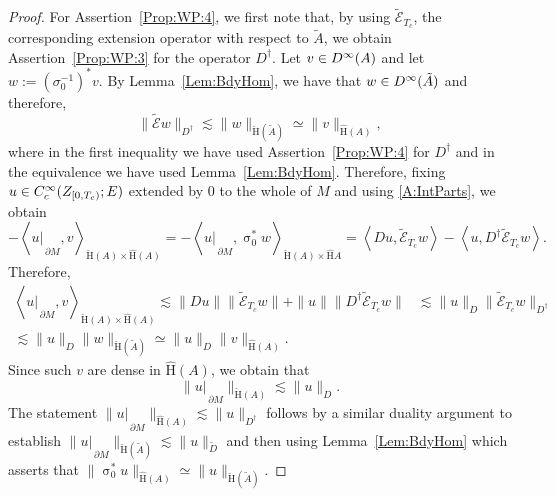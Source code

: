 \documentclass[a4paper,10pt,reqno]{amsart}
\newcommand{\sym}{\upsigma}
\newcommand{\rest}[1]{{{\lvert_{}}_{}}_{#1}}
\newcommand{\norm}[1]{\| #1 \|}%
\newcommand{\Ck}[2][{}]{{\rm C}^{#2}_{\rm #1}}%
\newcommand{\Dk}[2][{}]{{\rm D}^{#2}_{\rm #1}}%
\newcommand{\checkH}{\check{\mathrm{H}}}
\newcommand{\hatH}{\hat{\mathrm{H}}}
\newcommand{\inprod}[1]{\left\langle #1 \right\rangle}%
\newcommand{\ext}{\mathcal{E}}
\newcommand{\dM}{\partial M}
\theoremstyle{definition}
\begin{document}
\begin{proof}
For Assertion~\ref{Prop:WP:4}, we first note that, by using $\tilde{\ext}_{T_c}$, the corresponding extension operator with respect to $\tilde{A}$, we obtain Assertion~\ref{Prop:WP:3} for the operator $D^\dagger$.
Let $v \in \Dk{\infty}(A)$ and let $w := (\sigma_0^{-1})^\ast v$.
By Lemma~\ref{Lem:BdyHom}, we have that $w \in \Dk{\infty}(\tilde{A})$ and therefore,
$$ \norm{\tilde{\ext}w}_{D^\dagger} \lesssim \norm{w}_{\checkH(\tilde{A})} \simeq \norm{v}_{\hatH(A)},$$
where in the first inequality we have used Assertion~\ref{Prop:WP:4} for $D^\dagger$ and in the equivalence we have used Lemma~\ref{Lem:BdyHom}.
Therefore, fixing $u \in \Ck[c]{\infty}(Z_{[0,T_c)};E)$ extended by $0$ to the whole of $M$ and using \eqref{A:IntParts}, we obtain
$$ -\inprod{u\rest{\dM},v}_{\checkH(A) \times \hatH(A)} =  -\inprod{u\rest{\dM},\sym_0^\ast w}_{\checkH(A) \times \hatH{A}} = \inprod{Du, \tilde{\ext}_{T_c} w} - \inprod{u, D^\dagger \tilde{\ext}_{T_c} w}.$$
Therefore,
\begin{align*}
\inprod{u\rest{\dM},v}_{\checkH(A) \times \hatH(A)}
\lesssim \norm{Du} \norm{\tilde{\ext}_{T_c} w} + \norm{u} \norm{D^\dagger \tilde{\ext}_{T_c} w}
 & \lesssim \norm{u}_{D} \norm{\tilde{\ext}_{T_c} w}_{D^\dagger} \\
\lesssim \norm{u}_{D} \norm{w}_{\checkH(\tilde{A})}
\simeq \norm{u}_{D} \norm{v}_{\hatH(A)}.
\end{align*}
Since such $v$ are dense in $\hatH(A)$, we obtain that
\[
\norm{u\rest{\dM}}_{\checkH(A)} \lesssim \norm{u}_{D}.
\]
The statement $\norm{u\rest{\dM}}_{\hatH(A)} \lesssim \norm{u}_{ D^\dagger}$ follows by a similar duality argument to establish $\norm{u\rest{\dM}}_{\checkH(\tilde{A})} \lesssim \norm{u}_{\tilde{D}}$ and then using Lemma~\ref{Lem:BdyHom} which asserts that $\norm{\sym_0^\ast u}_{\hatH(A)} \simeq \norm{u}_{\checkH(\tilde{A})}$.
\end{proof}
\end{document}

